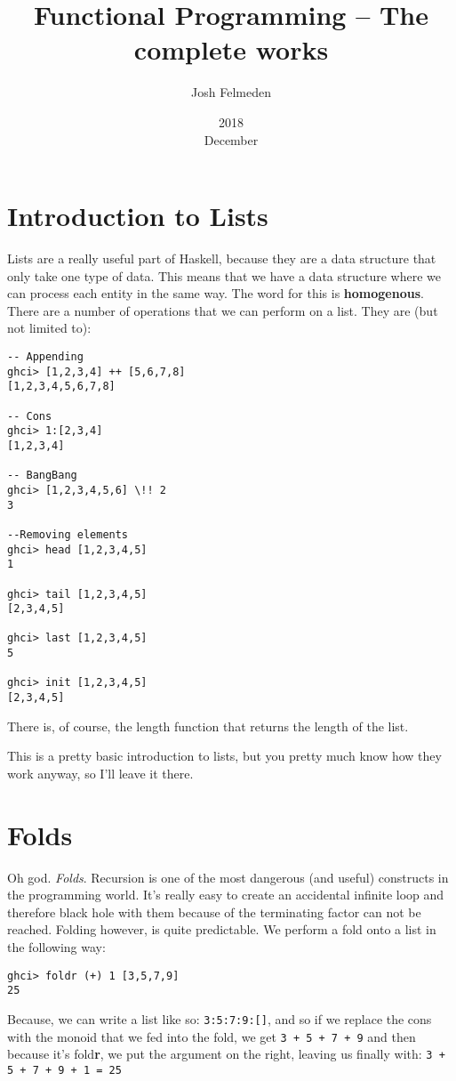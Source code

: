 \documentclass[11pt,a4paper,titlepage]{scrartcl}
\title{Functional Programming -- The complete works}
\author{Josh Felmeden}
\date{2018\\ December}
\begin{document}
\maketitle
\tableofcontents
\newpage

\section{Introduction to Lists}%
\label{sec:lists1}
Lists are a really useful part of Haskell, because they are a data structure
that only take one type of data. This means that we have a data structure where
we can process each entity in the same way. The word for this is
\textbf{homogenous}. There are a number of operations that we can perform on a
list. They are (but not limited to):
\begin{lstlisting}
-- Appending
ghci> [1,2,3,4] ++ [5,6,7,8]
[1,2,3,4,5,6,7,8]

-- Cons
ghci> 1:[2,3,4]
[1,2,3,4]

-- BangBang
ghci> [1,2,3,4,5,6] \!! 2
3

--Removing elements
ghci> head [1,2,3,4,5]
1

ghci> tail [1,2,3,4,5]
[2,3,4,5]

ghci> last [1,2,3,4,5]
5

ghci> init [1,2,3,4,5]
[2,3,4,5]
\end{lstlisting}
There is, of course, the length function that returns the length of the list.

This is a pretty basic introduction to lists, but you pretty much know how they
work anyway, so I'll leave it there.

\section{Folds}%
\label{sec:Folds}
Oh god. \textit{Folds}. Recursion is one of the most dangerous (and useful)
constructs in the programming world. It's really easy to create an accidental
infinite loop and therefore black hole with them because of the terminating
factor can not be reached. Folding however, is quite predictable. We perform a
fold onto a list in the following way:
\begin{lstlisting}
ghci> foldr (+) 1 [3,5,7,9]
25
\end{lstlisting}
Because, we can write a list like so: \lstinline|3:5:7:9:[]|, and so if we replace the
cons with the monoid that we fed into the fold, we get \lstinline|3 + 5 + 7 + 9|
and then because it's fold\textbf{r}, we put the argument on the right, leaving
us finally with: \lstinline|3 + 5 + 7 + 9 + 1 = 25|
\end{document}
